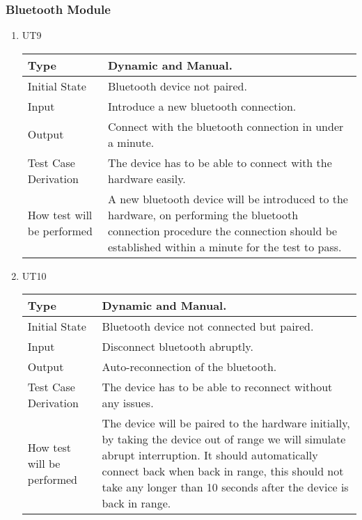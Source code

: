 \documentclass[12pt, titlepage]{article}
\begin{document}
\subsubsection{Bluetooth Module}

\begin{enumerate}

\item{UT9\\}

\begin{tabular}{ |p{5cm}||p{7cm}| }
    \hline
    Type & Dynamic and Manual. \\
    \hline
    Initial State  &  Bluetooth device not paired. \\
    \hline
    Input &   Introduce a new bluetooth connection. \\
    \hline
    Output &   Connect with the bluetooth connection in under a minute.  \\
    \hline
    Test Case Derivation &   The device has to be able to connect with the hardware easily. \\
    \hline
    How test will be performed & A new bluetooth device will be introduced to the hardware, on performing the bluetooth connection procedure the connection should be established within a minute for the test to pass. \\
    \hline
\end{tabular}

\item{UT10\\}

\begin{tabular}{ |p{5cm}||p{7cm}| }
    \hline
    Type & Dynamic and Manual. \\
    \hline
    Initial State  &  Bluetooth device not connected but paired. \\
    \hline
    Input &   Disconnect bluetooth abruptly. \\
    \hline
    Output &   Auto-reconnection of the bluetooth.  \\
    \hline
    Test Case Derivation &   The device has to be able to reconnect without any issues. \\
    \hline
    How test will be performed & The device will be paired to the hardware initially, by taking the device out of range we will simulate abrupt interruption. It should automatically connect back when back in range, this should not take any longer than 10 seconds after the device is back in range. \\
    \hline
\end{tabular}

\end{enumerate}
\end{document}
